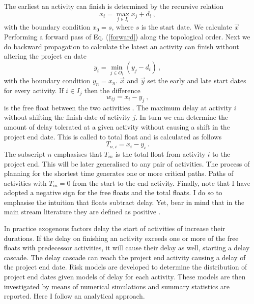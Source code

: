 \documentclass[reprint,aps,prl,amsmath,amssymb,superscriptaddress,showpacs]{revtex4-1}
\begin{document}
The earliest an activity can finish is determined by the recursive relation
%
\begin{equation}
x_i = \max_{j\in I_i} x_j + d_i\ ,
\label{forward} 
\end{equation}
%
with the boundary condition $x_0=s$, where $s$ is the start date. We calculate $\vec{x}$ Performing a forward pass of  Eq. (\ref{forward}) along the topological order. Next we do backward propagation to calculate the latest an activity can finish without altering the project en date
%
\begin{equation}
y_i = \min_{j \in O_i} \left(y_j - d_i\right)\ ,
\label{backward} 
\end{equation}
%
with the boundary condition $y_n=x_n$. $\vec{x}$ and $\vec{y}$ set the early and late start dates for every activity. If $i\in I_j$ then the difference 
%
\begin{equation}
w_{ij} = x_i - y_j\ ,
\label{w}
\end{equation}
%
is the free float between the two activities \cite{van13}. The maximum delay at activity $i$ without shifting the finish date of activity $j$. In turn we can determine the amount of delay tolerated at a given activity without causing a shift in the project end date. This is called to total float and is calculated as follows
%
\begin{equation}
T_{n,i} = x_i-y_i\ .
\label{Tn} 
\end{equation}
%
The subscript $n$ emphasises that $T_{in}$ is the total float from activity $i$ to the project end. This will be later generalised to any pair of activities. The process of planning for the shortest time generates one or more critical paths. Paths of activities with $T_{in}=0$ from the start to the end activity. Finally, note that I have adopted a negative sign for the free floats and the total floats. I do so to emphasise the intuition that floats subtract delay. Yet, bear in mind that in the main stream literature they are defined as positive \cite{van13}.

In practice exogenous factors delay the start of activities of increase their durations. If the delay on finishing an activity exceeds one or more of the free floats with predecessor activities, it will cause their delay as well, starting a delay cascade. The delay cascade can reach the project end activity causing a delay of the project end date. Risk models are developed to determine the distribution of project end dates given models of delay for each activity. These models are then investigated by means of numerical simulations and summary statistics are reported. Here I follow an analytical approach.
\end{document}
